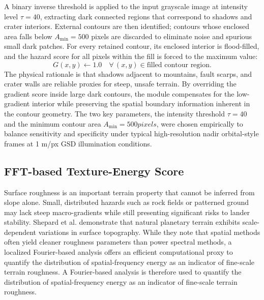 \documentclass{article}
\begin{document}
A binary inverse threshold is applied to the input grayscale image at intensity level $\tau = 40$, extracting dark connected regions that correspond to shadows and crater interiors. External contours are then identified; contours whose enclosed area falls below $A_{\min} = 500$ pixels are discarded to eliminate noise and spurious small dark patches. For every retained contour, its enclosed interior is flood-filled, and the hazard score for all pixels within the fill is forced to the maximum value:
\begin{equation}
    G(x,y) \leftarrow 1.0 \quad \forall\,(x,y) \in \text{filled contour region}.
\end{equation}
The physical rationale is that shadows adjacent to mountains, fault scarps, and crater walls are reliable proxies for steep, unsafe terrain. By overriding the gradient score inside large dark contours, the module compensates for the low-gradient interior while preserving the spatial boundary information inherent in the contour geometry. The two key parameters, the intensity threshold $\tau = 40$ and the minimum contour area $A_{\min} = 500 pixels$, were chosen empirically to balance sensitivity and specificity under typical high-resolution nadir orbital-style frames at 1 m/px GSD illumination conditions.

\subsection{FFT-based Texture-Energy Score}
Surface roughness is an important terrain property that cannot be inferred from slope alone. Small, distributed hazards such as rock fields or patterned ground may lack steep macro-gradients while still presenting significant risks to lander stability. Shepard et al. \cite{shepard2001roughness} demonstrate that natural planetary terrain exhibits scale-dependent variations in surface topography. While they note that spatial methods often yield cleaner roughness parameters than power spectral methods, a localized Fourier-based analysis offers an efficient computational proxy to quantify the distribution of spatial-frequency energy as an indicator of fine-scale terrain roughness. A Fourier-based analysis is therefore used to quantify the distribution of spatial-frequency energy as an indicator of fine-scale terrain roughness.
 
\end{document}
